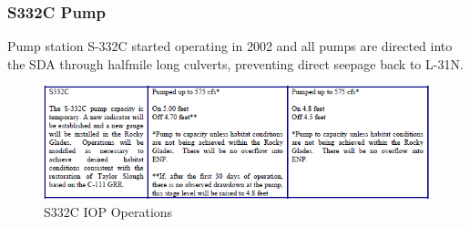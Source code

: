 %
%


\clearpage
\subsubsection{S332C Pump}
Pump station S-332C started operating in 2002 and all pumps are directed into the SDA through halfmile long culverts, preventing direct seepage back to L-31N.



\begin{figure}[!h]
  \begin{center}
  \includegraphics[width=6.5in]{../figs/S332C_IOPops.png}
  \caption{S332C IOP Operations}
  \label{fig:S332Ciop}
  \end{center}
\end{figure}



